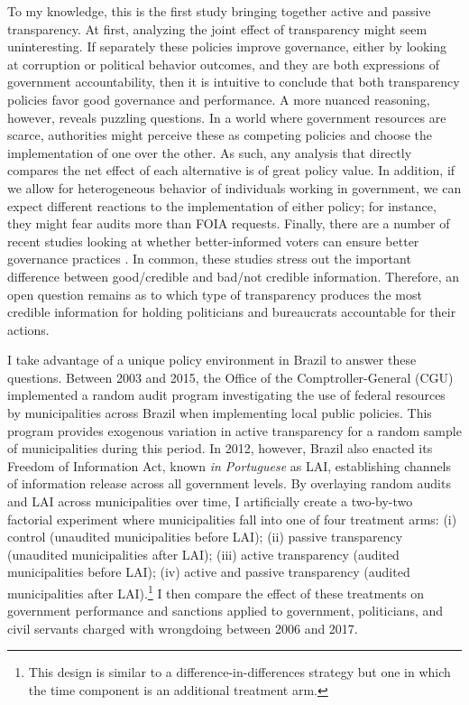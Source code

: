 \documentclass[11pt]{article}
\begin{document}
To my knowledge, this is the first study bringing together active and passive transparency. At first, analyzing the joint effect of transparency might seem uninteresting. If separately these policies improve governance, either by looking at corruption or political behavior outcomes, and they are both expressions of government accountability, then it is intuitive to conclude that both transparency policies favor good governance and performance. A more nuanced reasoning, however, reveals puzzling questions. In a world where government resources are scarce, authorities might perceive these as competing policies and choose the implementation of one over the other. As such, any analysis that directly compares the net effect of each alternative is of great policy value. In addition, if we allow for heterogeneous behavior of individuals working in government, we can expect different reactions to the implementation of either policy; for instance, they might fear audits more than FOIA requests. Finally, there are a number of recent studies looking at whether better-informed voters can ensure better governance practices \citep{PandeCaninformedvoters2011,WintersLackingInformationCondoning2013,ChongDoesCorruptionInformation2015,Weitz-ShapiroCanCitizensDiscern2017}. In common, these studies stress out the important difference between good/credible and bad/not credible information. Therefore, an open question remains as to which type of transparency produces the most credible information for holding politicians and bureaucrats accountable for their actions.

I take advantage of a unique policy environment in Brazil to answer these questions. Between 2003 and 2015, the Office of the Comptroller-General (CGU) implemented a random audit program investigating the use of federal resources by municipalities across Brazil when implementing local public policies. This program provides exogenous variation in active transparency for a random sample of municipalities during this period. In 2012, however, Brazil also enacted its Freedom of Information Act, known  \emph{in Portuguese} as LAI, establishing channels of information release across all government levels. By overlaying random audits and LAI across municipalities over time, I artificially create a two-by-two factorial experiment where municipalities fall into one of four treatment arms: (i) control (unaudited municipalities before LAI); (ii) passive transparency (unaudited municipalities after LAI); (iii) active transparency (audited municipalities before LAI); (iv) active and passive transparency (audited municipalities after LAI).\footnote{This design is similar to a difference-in-differences strategy but one in which the time component is an additional treatment arm.} I then compare the effect of these treatments on government performance and sanctions applied to government, politicians, and civil servants charged with wrongdoing between 2006 and 2017.
\end{document}

